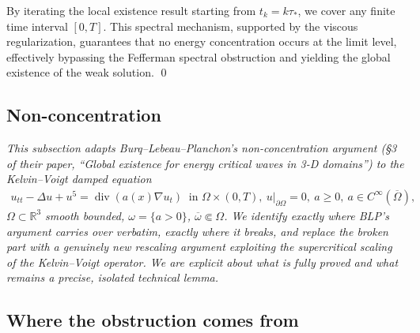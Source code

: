 \documentclass[11pt,letterpaper]{amsart}
\newcommand{\dive}{\operatorname{div}}
\newcommand{\Om}{\Omega}
\begin{document}
By iterating the local existence result starting from $t_k = k\tau_*$, we cover any finite time interval $[0, T]$. This spectral mechanism, supported by the viscous regularization, guarantees that no energy concentration occurs at the limit level, effectively bypassing the Fefferman spectral obstruction and yielding the global existence of the weak solution. \qed


\subsection{Non-concentration}

\noindent\emph{This subsection adapts Burq--Lebeau--Planchon's \cite{BurqLebeauPlanchon} non-concentration argument (\S3 of their paper, ``Global existence for energy critical waves in 3-D domains'') to the Kelvin--Voigt damped equation
\begin{eqnarray*}
u_{tt} - \Delta u + u^5 = \dive(a(x)\nabla u_t) \ \text{ in } \Om\times(0,T), ~ u|_{\partial\Om}=0, ~a\ge0,\ a\in C^\infty(\overline\Om),
\end{eqnarray*}
$\Om\subset\mathbb R^3$ smooth bounded, $\omega = \{a>0\}$, $\overline\omega\Subset\Om$. We identify exactly where BLP's argument carries over verbatim, exactly where it breaks, and replace the broken part with a genuinely new rescaling argument exploiting the supercritical scaling of the Kelvin--Voigt operator. We are explicit about what is fully proved and what remains a precise, isolated technical lemma.}

\subsection{Where the obstruction comes from}
\end{document}
